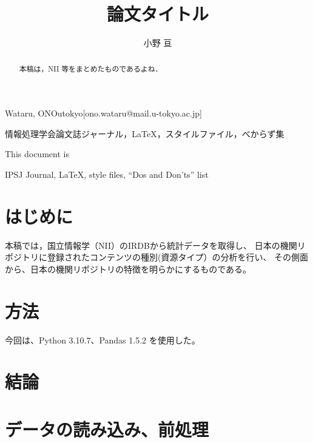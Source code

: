 \documentclass[submit,noauthor]{ono}
\begin{document}
\title{論文タイトル\\}



\author{小野 亘}{Wataru, ONO}{utokyo}[ono.wataru@mail.u-tokyo.ac.jp]

\begin{abstract}
	本稿は，NII 等をまとめたものであるよね．
\end{abstract}


\begin{jkeyword}
	情報処理学会論文誌ジャーナル，\LaTeX，スタイルファイル，べからず集
\end{jkeyword}

\begin{eabstract}
	This document is
\end{eabstract}

\begin{ekeyword}
	IPSJ Journal, \LaTeX, style files, ``Dos and Don'ts'' list
\end{ekeyword}

\maketitle

\section{はじめに}

本稿では，国立情報学（NII）のIRDBから統計データを取得し、
日本の機関リポジトリに登録されたコンテンツの種別(資源タイプ）の分析を行い、
その側面から、日本の機関リポジトリの特徴を明らかにするものである。


\section{方法}
今回は、Python 3.10.7、Pandas 1.5.2 を使用した。

\section{結論}

\section{データの読み込み、前処理}
\end{document}
